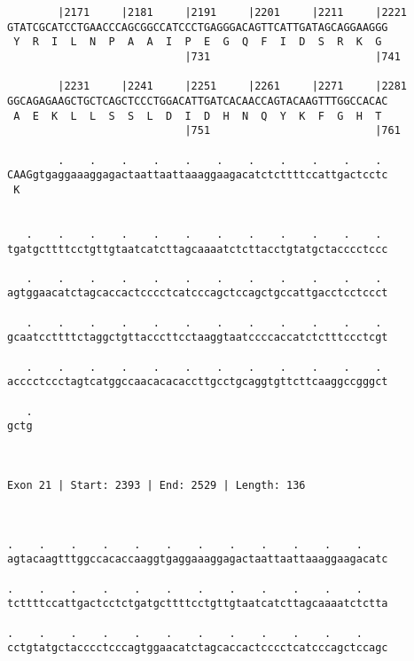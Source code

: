 \documentclass{article}
\begin{document}
\begin{Verbatim}
        |2171     |2181     |2191     |2201     |2211     |2221
GTATCGCATCCTGAACCCAGCGGCCATCCCTGAGGGACAGTTCATTGATAGCAGGAAGGG
 Y  R  I  L  N  P  A  A  I  P  E  G  Q  F  I  D  S  R  K  G 
                            |731                          |741
  
        |2231     |2241     |2251     |2261     |2271     |2281
GGCAGAGAAGCTGCTCAGCTCCCTGGACATTGATCACAACCAGTACAAGTTTGGCCACAC
 A  E  K  L  L  S  S  L  D  I  D  H  N  Q  Y  K  F  G  H  T 
                            |751                          |761
  
        .    .    .    .    .    .    .    .    .    .    . 
CAAGgtgaggaaaggagactaattaattaaaggaagacatctcttttccattgactcctc
 K                                                          
                                                            
  
   .    .    .    .    .    .    .    .    .    .    .    . 
tgatgcttttcctgttgtaatcatcttagcaaaatctcttacctgtatgctacccctccc
                                                            
   .    .    .    .    .    .    .    .    .    .    .    . 
agtggaacatctagcaccactcccctcatcccagctccagctgccattgacctcctccct
                                                            
   .    .    .    .    .    .    .    .    .    .    .    . 
gcaatccttttctaggctgttacccttcctaaggtaatccccaccatctctttccctcgt
                                                            
   .    .    .    .    .    .    .    .    .    .    .    . 
acccctccctagtcatggccaacacacaccttgcctgcaggtgttcttcaaggccgggct
                                                            
   .
gctg
    
    
 
Exon 21 | Start: 2393 | End: 2529 | Length: 136



.    .    .    .    .    .    .    .    .    .    .    .    
agtacaagtttggccacaccaaggtgaggaaaggagactaattaattaaaggaagacatc
                                                            
.    .    .    .    .    .    .    .    .    .    .    .    
tcttttccattgactcctctgatgcttttcctgttgtaatcatcttagcaaaatctctta
                                                            
.    .    .    .    .    .    .    .    .    .    .    .    
cctgtatgctacccctcccagtggaacatctagcaccactcccctcatcccagctccagc
                                                            

\end{Verbatim}
\end{document}
